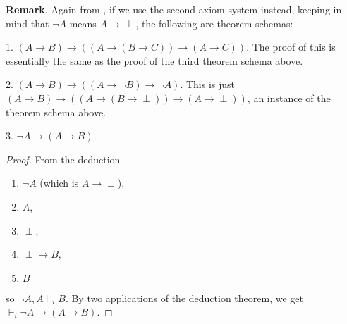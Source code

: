 \documentclass[12pt]{article}
\begin{document}
\textbf{Remark}.  Again from , if we use the second axiom system instead, keeping in mind that $\neg A$ means $A\to \perp$, the following are theorem schemas:

1. $(A \to B) \to ((A \to (B \to C)) \to (A \to C))$.  The proof of this is essentially the same as the proof of the third theorem schema above.

2. $(A \to B) \to ((A \to \neg B) \to \neg A)$.  This is just $(A \to B) \to ((A \to (B \to \perp)) \to (A \to \perp))$, an instance of the theorem schema above.

3. $\neg A \to  (A \to B)$.
\begin{proof} From the deduction
\begin{multicols}{3}
\begin{enumerate}
\item $\neg A$ (which is $A\to \perp$),
\item $A$,
\item $\perp$,
\item $\perp \to B$,
\item $B$
\end{enumerate}
\end{multicols}
so $\neg A, A \vdash_i B$.  By two applications of the deduction theorem, we get $\vdash_i \neg A \to (A \to B)$.
\end{proof}

\end{document}

